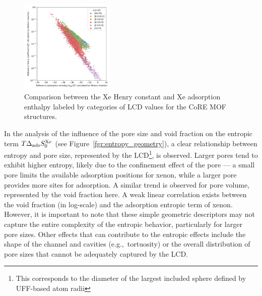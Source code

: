 \documentclass[main.tex]{subfiles}
\begin{document}
\begin{figure}[ht]
  \centering
  \includegraphics[width=0.4\textwidth]{figures/2-thermo/H_Xe_widom_vs_K_Xe_widom_overview.jpg}
  \caption{Comparison between the Xe Henry constant and Xe adsorption enthalpy labeled by categories of LCD values for the CoRE MOF structures.}\label{fgr:henry_enthalpy}
\end{figure}

In the analysis of the influence of the pore size and void fraction on the entropic term $T\Delta_{\text{ads}}S^{\text{Xe}}_{\text{0}}$ (see Figure~\ref{fgr:entropy_geometry}), a clear relationship between entropy and pore size, represented by the LCD\footnote[1]{This corresponds to the diameter of the largest included sphere defined by UFF-based atom radii}, is observed. Larger pores tend to exhibit higher entropy, likely due to the confinement effect of the pore --- a small pore limits the available adsorption positions for xenon, while a larger pore provides more sites for adsorption. A similar trend is observed for pore volume, represented by the void fraction here. A weak linear correlation exists between the void fraction (in log-scale) and the adsorption entropic term of xenon. However, it is important to note that these simple geometric descriptors may not capture the entire complexity of the entropic behavior, particularly for larger pore sizes. Other effects that can contribute to the entropic effects include the shape of the channel and cavities (e.g.,\ tortuosity) or the overall distribution of pore sizes that cannot be adequately captured by the LCD.
\end{document}
